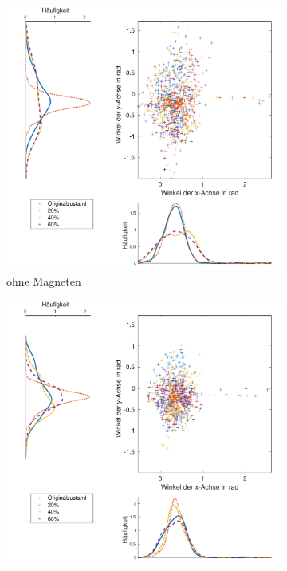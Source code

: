 \begin{landscape}
	\begin{figure}[tb]
		\centering
			\begin{subfigure}[c]{.45\linewidth}
				\centering
				\includegraphics[width=\linewidth]{Bilder/Winkel_Grund_20_40_60_ohneM.pdf}
				\caption{ohne Magneten}
			\end{subfigure}
			\hfill
			\begin{subfigure}[c]{.45\linewidth}
				\centering
				\includegraphics[width=\linewidth]{Bilder/Winkel_Grund_20_40_60_mitM.pdf}

\end{subfigure}
\end{figure}
\end{landscape}
